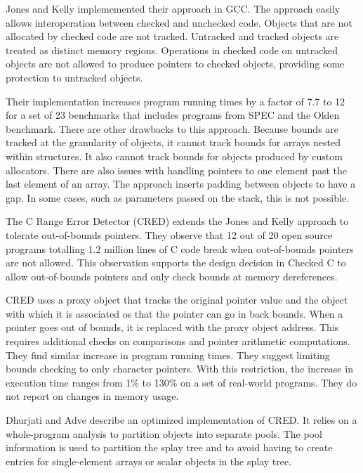 Jones and Kelly implememented their approach in GCC.   The approach easily allows
interoperation between checked and unchecked code.  Objects that are not allocated by
checked code are not tracked.  Untracked and tracked objects are treated as distinct memory regions.  Operations in checked code on untracked objects are not allowed to produce pointers to checked objects, providing some protection to untracked objects.  

Their implementation increases program running
times by a factor of 7.7 to 12 \cite{Nagarakatte2009} for  a set of
23 benchmarks that includes programs from SPEC and the Olden benchmark.
There are other drawbacks to this approach.
Because bounds are tracked at the granularity of objects, it
cannot track bounds for arrays nested within structures.  It also cannot
track bounds for objects produced by custom allocators.  There are also
issues with handling pointers to one element past the last element of
an array.  The approach inserts padding between objects to have a gap.  In some
cases, such as parameters passed on the stack, this is not possible.

The C Range Error Detector (CRED) \cite{Ruwase2004} extends the Jones and Kelly
approach to tolerate out-of-bounds pointers.  They observe that 12 out of
20 open source programs totalling 1.2 million lines of C code break when
out-of-bounds pointers are not allowed.   This observation supports the
design decision in Checked C to allow out-of-bounds pointers and only
check bounds at memory dereferences.

CRED uses a proxy object that
tracks the original pointer value and the object with which it is associated
os that the pointer can go in back bounds.  When a pointer goes out of
bounds, it is replaced with the proxy object address.  This requires
additional checks on comparisons and pointer arithmetic computations.
They find similar increase in program running times.  They suggest
limiting bounds checking to only character pointers. With this restriction,
the increase in execution time  ranges from 1\% to 130\% on a set of real-world
programs.  They do not report on changes in memory usage.

Dhurjati and Adve \cite{Dhurjati2006} describe an optimized implementation of
CRED.  It relies on a whole-program analysis to partition
objects into separate pools.  The pool information is used to partition
the splay tree and  to avoid having to create entries for single-element arrays 
or scalar objects in the splay tree.

